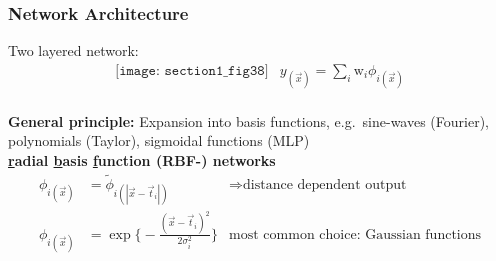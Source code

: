 \subsubsection{Network Architecture}
Two layered network:
\[ \begin{array}{ll}
	\texttt{[image: section1\_fig38]}
	& y_{(\vec{x})} = \sum\limits_i \mathrm{w}_i \phi_{i(\vec{x})}
\end{array} \]
\\
\textbf{General principle:} Expansion into basis functions, e.g.\ sine-waves (Fourier), polynomials (Taylor), sigmoidal functions (MLP)
\\
{\bf\underline{r}adial \underline{b}asis \underline{f}unction (RBF-) networks}
\begin{equation}
	\begin{array}{lll}
	\phi_{i(\vec{x})} & = \widetilde{\phi}_{i(|\vec{x} - \vec{t}_i|)}
		& \Rightarrow \text{distance dependent output} \\
	\phi_{i(\vec{x})} 
	& = \exp \bigg\{ -\frac{(\vec{x} - \vec{t}_i)^2}{2 \sigma_i^2} \bigg\} 
		& \text{most common choice: Gaussian functions}
	\end{array}
\end{equation}

